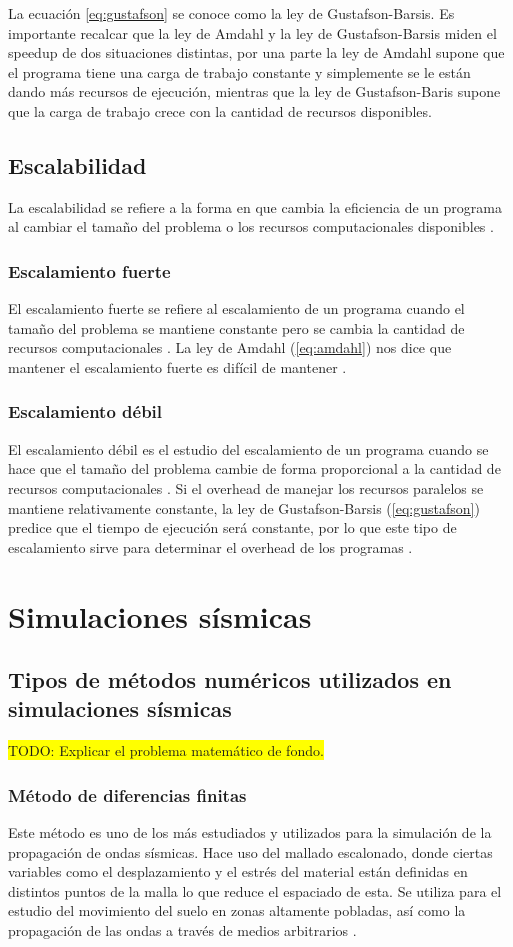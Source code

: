 La ecuación \ref{eq:gustafson} se conoce como la ley de Gustafson-Barsis. Es importante recalcar que la ley de Amdahl y la ley de Gustafson-Barsis miden el speedup de dos situaciones distintas, por una parte la ley de Amdahl supone que el programa tiene una carga de trabajo constante y simplemente se le están dando más recursos de ejecución, mientras que la ley de Gustafson-Baris supone que la carga de trabajo crece con la cantidad de recursos disponibles.
\subsection{Escalabilidad}
La escalabilidad se refiere a la forma en que cambia la eficiencia de un programa al cambiar el tamaño del problema o los recursos computacionales disponibles \cite{Pacheco2011-sb}.
\subsubsection{Escalamiento fuerte}
El escalamiento fuerte se refiere al escalamiento de un programa cuando el tamaño del problema se mantiene constante pero se cambia la cantidad de recursos computacionales \cite{Pacheco2011-sb}. La ley de Amdahl (\ref{eq:amdahl}) nos dice que mantener el escalamiento fuerte es difícil de mantener \cite{Mattson2019-vv}.
\subsubsection{Escalamiento débil}
El escalamiento débil es el estudio del escalamiento de un programa cuando se hace que el tamaño del problema cambie de forma proporcional a la cantidad de recursos computacionales \cite{Pacheco2011-sb}. Si el overhead de manejar los recursos paralelos se mantiene relativamente constante, la ley de Gustafson-Barsis (\ref{eq:gustafson}) predice que el tiempo de ejecución será constante, por lo que este tipo de escalamiento sirve para determinar el overhead de los programas \cite{Mattson2019-vv}.
\section{Simulaciones sísmicas}
\subsection{Tipos de métodos numéricos utilizados en simulaciones sísmicas}
\colorbox{yellow}{TODO: Explicar el problema matemático de fondo.}
\subsubsection{Método de diferencias finitas}
Este método es uno de los más estudiados y utilizados para la simulación de la propagación de ondas sísmicas. Hace uso del mallado escalonado, donde ciertas variables como el desplazamiento y el estrés del material están definidas en distintos puntos de la malla lo que reduce el espaciado de esta. Se utiliza para el estudio del movimiento del suelo en zonas altamente pobladas, así como la propagación de las ondas a través de medios arbitrarios \cite{Fichtner2011}.
